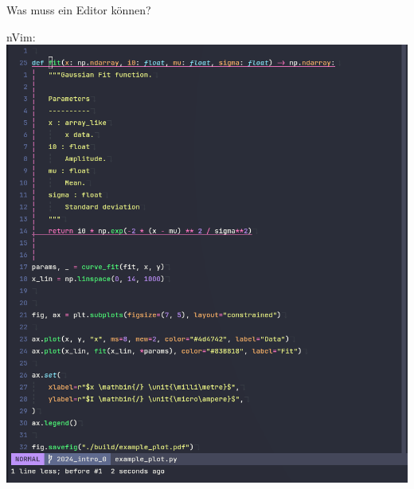 \begin{frame}{Was muss ein Editor können?}
\begin{minipage}{0.3\textwidth}
    nVim:
    \includegraphics[height=0.7\textheight]{figures/nvim_example_screenshot.png}
  \end{minipage}
\end{frame}

